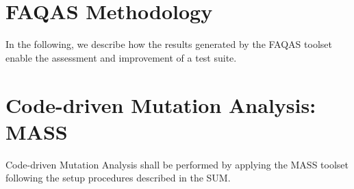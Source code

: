 
\section{FAQAS Methodology}


In the following, we describe how the results generated by the FAQAS toolset enable the assessment and improvement of a test suite.


\section{Code-driven Mutation Analysis: MASS}
\label{sec:meth:mass}

Code-driven Mutation Analysis shall be performed by applying the MASS toolset following the setup procedures described in the SUM.